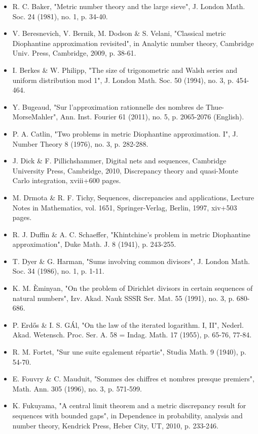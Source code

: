 \documentclass[10pt]{article}
\begin{document}
\begin{itemize}
  \item[] [6] R. C. Baker, "Metric number theory and the large sieve", J. London Math. Soc. 24 (1981), no. 1, p. 34-40.
  \item[] [7] V. Beresnevich, V. Bernik, M. Dodson \& S. Velani, "Classical metric Diophantine approximation revisited", in Analytic number theory, Cambridge Univ. Press, Cambridge, 2009, p. 38-61.
  \item[] [8] I. Berkes \& W. Philipp, "The size of trigonometric and Walsh series and uniform distribution mod 1", J. London Math. Soc. 50 (1994), no. 3, p. 454-464.
  \item[] [9] Y. Bugeaud, "Sur l'approximation rationnelle des nombres de Thue-MorseMahler", Ann. Inst. Fourier 61 (2011), no. 5, p. 2065-2076 (English).
  \item[] [10] P. A. Catlin, "Two problems in metric Diophantine approximation. I", J. Number Theory 8 (1976), no. 3, p. 282-288.
  \item[] [11] J. Dick \& F. Pillichshammer, Digital nets and sequences, Cambridge University Press, Cambridge, 2010, Discrepancy theory and quasi-Monte Carlo integration, xviii+600 pages.
  \item[] [12] M. Drmota \& R. F. Tichy, Sequences, discrepancies and applications, Lecture Notes in Mathematics, vol. 1651, Springer-Verlag, Berlin, 1997, xiv+503 pages.
  \item[] [13] R. J. Duffin \& A. C. Schaeffer, "Khintchine's problem in metric Diophantine approximation", Duke Math. J. 8 (1941), p. 243-255.
  \item[] [14] T. Dyer \& G. Harman, "Sums involving common divisors", J. London Math. Soc. 34 (1986), no. 1, p. 1-11.
  \item[] [15] K. M. Èminyan, "On the problem of Dirichlet divisors in certain sequences of natural numbers", Izv. Akad. Nauk SSSR Ser. Mat. 55 (1991), no. 3, p. 680-686.
  \item[] [16] P. Erdős \& I. S. GÁl, "On the law of the iterated logarithm. I, II", Nederl. Akad. Wetensch. Proc. Ser. A. 58 = Indag. Math. 17 (1955), p. 65-76, 77-84.
  \item[] [17] R. M. Fortet, "Sur une suite egalement répartie", Studia Math. 9 (1940), p. 54-70.
  \item[] [18] E. Fouvry \& C. Mauduit, "Sommes des chiffres et nombres presque premiers", Math. Ann. 305 (1996), no. 3, p. 571-599.
  \item[] [19] K. Fukuyama, "A central limit theorem and a metric discrepancy result for sequences with bounded gaps", in Dependence in probability, analysis and number theory, Kendrick Press, Heber City, UT, 2010, p. 233-246.

\end{itemize}
\end{document}
